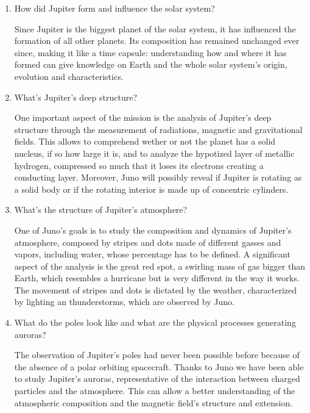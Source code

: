 \begin{enumerate}
    \item How did Jupiter form and influence the solar system?

    Since Jupiter is the biggest planet of the solar system, it has influenced the formation of all other planets. Its composition has remained unchanged ever since, making it like a time capsule: understanding how and where it has formed can give knowledge on Earth and the whole solar system’s origin, evolution and characteristics.

 
    \item What's Jupiter's deep structure?
    
    One important aspect of the mission is the analysis of Jupiter's deep structure through the measurement of radiations, magnetic and gravitational fields. This allows to comprehend wether or not the planet has a solid nucleus, if so how large it is, and to analyze the hypotized layer of metallic hydrogen, compressed so much that it loses its electrons creating a conducting layer.  Moreover, Juno will possibly reveal if Jupiter is rotating as a solid body or if the rotating interior is made up of concentric cylinders.

    \item What's the structure of Jupiter's atmosphere?
    
    One of Juno's goals is to study the composition and dynamics of Jupiter's atmosphere, composed by stripes and dots made of different gasses and vapors, including water, whose percentage has to be defined. A significant aspect of the analysis is the great red spot, a swirling mass of gas bigger than Earth, which resembles a hurricane but is very different in the way it works. The movement of stripes and dots is dictated by the weather, characterized by lighting an thunderstorms, which are observed by Juno.

    \item What do the poles look like and what are the physical processes generating auroras?
    
    The observation of Jupiter's poles had never been possible before because of the absence of a polar orbiting spacecraft. Thanks to Juno we have been able to study Jupiter's auroras, representative of the interaction between charged particles and the atmosphere. This can allow a better understanding of the atmospheric composition and the magnetic field's structure and extension.

\end{enumerate}

